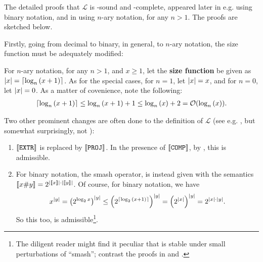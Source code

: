 The detailed proofs that $\mathcal{L}$ is \FPTIME-sound and \FPTIME-complete,
appeared later in e.g.  \cite{rose-1984,clote-1999} using binary notation, and
in \cite{tourlakis-1984} using $n$-ary notation, for any $n>1$.  The proofs are
sketched below.

Firstly, going from decimal to binary, in general, to $n$-ary notation, the
size function must be adequately modified:

\begin{definition} \label{def:n-ary-notation} For $n$-ary notation, for any
$n>1$, and $x\geq 1$, let the \textbf{size function} be given as ${\mathopen{}\left|{x}\right|\mathclose{}} =
\mathopen{}\left\lceil{\log_n{\ensuremath{\mathopen{}\left({x+1}\right)\mathclose{}}}}\right\rceil\mathclose{}$. As for the special cases, for $n=1$, let ${\mathopen{}\left|{x}\right|\mathclose{}}=x$,
and for $n=0$, let ${\mathopen{}\left|{x}\right|\mathclose{}}=0$. As a matter of covenience, note the
following:\begin{align*}
%
\ceil{\log_n\p{x+1}} \leq \log_n\p{x+1} + 1 \leq \log_n\p{x} + 2 =
\bigOh{\log_n\p{x}}.
%
\end{align*}  \end{definition}

Two other prominent changes are often done to the definition of $\mathcal{L}$
(see e.g. \cite{rose-1984, buss-phd-1985-6, bellantoni-cook-1992, clote-1999},
but somewhat surprisingly, not \cite{tourlakis-1984}):

\begin{enumerate}[label=(\arabic*)]

\item ${\mathopen{}\left\llbracket{\mathtt{EXTR}}\right\rrbracket\mathclose{}}$ is replaced by ${\mathopen{}\left\llbracket{\mathtt{PROJ}}\right\rrbracket\mathclose{}}$. In the
presence of ${\mathopen{}\left\llbracket{\mathtt{COMP}}\right\rrbracket\mathclose{}}$, by , this is
admissible.

\item For binary notation, the smash operator, is instead given with the
semantics ${\mathopen{}\left\llbracket{x \ensuremath{\mathtt{\#}}{} y}\right\rrbracket\mathclose{}} = 2^{{\mathopen{}\left|{{\mathopen{}\left\llbracket{x}\right\rrbracket\mathclose{}}}\right|\mathclose{}} \cdot {\ensuremath{\mathopen{}\left|{{\mathopen{}\left\llbracket{y}\right\rrbracket\mathclose{}}}\right|\mathclose{}}}}$. Of
course, for binary notation, we have\begin{align*}
%
x^\card{y} = \p{2^{\log_2{x}}}^\card{y} \leq
\p{2^{\ceil{\log_2\p{x+1}}}}^\card{y} = \p{2^\card{x}}^\card{y} = 2^{\card{x}
\cdot \card{y}}.
%
\end{align*}So this too, is admissible\footnote{The diligent reader might find
it peculiar that \FPTIME{} is stable under small perturbations of ``smash'';
contrast the proofs in \cite{tourlakis-1984} and \cite{clote-1999}.}.

\end{enumerate}

